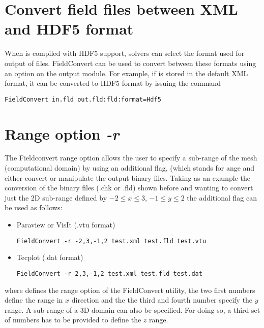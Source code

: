 \section{Convert field files between XML and HDF5 format}
%
When \nekpp is compiled with HDF5 support, solvers can select the format used
for output of  files. FieldConvert can be used to convert between
these formats using an option on the  output module. For example, if
 is stored in the default XML format, it can be converted to HDF5
format by issuing the command
%
\begin{lstlisting}[style=BashInputStyle]
FieldConvert in.fld out.fld:fld:format=Hdf5
\end{lstlisting}
%
\section{Range option \textit{-r}}
The Fieldconvert range option  allows the user to specify
a sub-range of the mesh (computational domain) by using an
additional flag,  (which stands for ange and either
convert or manipulate the \nekpp output binary files.
Taking as an example the conversion of the \nekpp binary files
(.chk or .fld) shown before and wanting to convert just the 2D
sub-range defined by $-2\leq x \leq 3$, $-1\leq y \leq 2$ the
additional flag  can be used as follows:
%
\begin{itemize}
\item Paraview or VisIt (.vtu format)
%
\begin{lstlisting}[style=BashInputStyle]
FieldConvert -r -2,3,-1,2 test.xml test.fld test.vtu
\end{lstlisting}
%
\item Tecplot (.dat format)
%
\begin{lstlisting}[style=BashInputStyle]
FieldConvert -r 2,3,-1,2 test.xml test.fld test.dat
\end{lstlisting}
%
\end{itemize}
where  defines the range option of the FieldConvert
utility, the two first numbers define the range in $x$ direction
and the the third and fourth number specify the $y$ range.
A sub-range of a 3D domain can also be specified.
For doing so, a third set of numbers has to be provided
to define the $z$ range.
%
%
%
